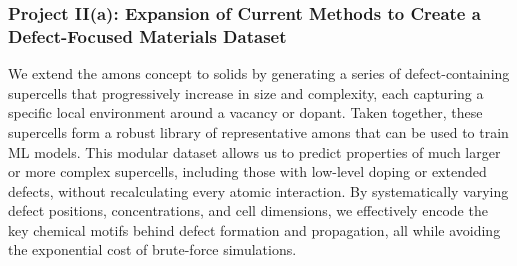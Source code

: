 \documentclass[11pt,english,calcwidth,compact]{nserc-appendix}
\begin{document}
%
%
\subsubsection*{Project II(a): Expansion of Current Methods to Create a Defect-Focused Materials Dataset}  

We extend the amons concept to solids by generating a series of defect-containing supercells that progressively increase in size and complexity, each capturing a specific local environment around a vacancy or dopant. Taken together, these supercells form a robust library of representative amons that can be used to train ML models. This modular dataset allows us to predict properties of much larger or more complex supercells, including those with low-level doping or extended defects, without recalculating every atomic interaction. By systematically varying defect positions, concentrations, and cell dimensions, we effectively encode the key chemical motifs behind defect formation and propagation, all while avoiding the exponential cost of brute-force simulations.
\end{document}
